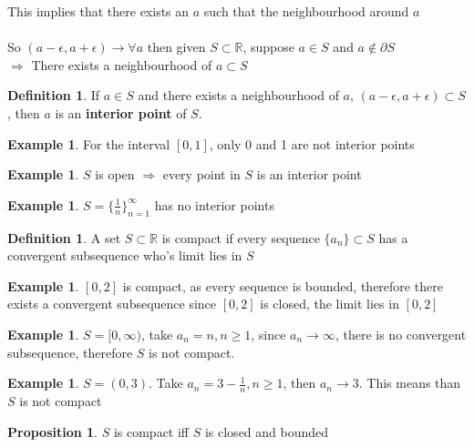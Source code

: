 \documentclass[12pt]{article}
\theoremstyle{plain}
\theoremstyle{definition}
\newtheorem{definition}[theorem]{Definition}
\newtheorem{example}[theorem]{Example}
\newtheorem{proposition}[theorem]{Proposition}
\begin{document}
This implies that there exists an $a$ such that the neighbourhood around $a$
\\
	 \\
	 So $(a-\epsilon, a+\epsilon) \to \forall a$ then given $S \subset \mathbb{R}$, suppose $a \in S$ and $a \not\in \partial S$\\
	  $\Longrightarrow$ There exists a neighbourhood of $a \subset S$

\begin{definition}
	If $a \in S$ and there exists a neighbourhood of $a$, $(a-\epsilon, a+\epsilon) \subset S$, then $a$ is an \textbf{interior point} of $S$.
\end{definition}

\begin{example}
	For the interval $[0,1]$, only 0 and 1 are not interior points
\end{example}

\begin{example}
	$S$ is open $\Longrightarrow$ every point in $S$ is an interior point
\end{example}

\begin{example}
	$S = \{ \frac{1}{n} \}^\infty_{n=1}$ has no interior points
\end{example}

\begin{definition}
	A set $S \subset \mathbb{R}$ is compact if every sequence $\{ a_n \} \subset S $ has a convergent subsequence who's limit lies in $S$
\end{definition}

\begin{example}
	$[0,2]$ is compact, as every sequence is bounded, therefore there exists a convergent subsequence since $[0,2]$ is closed, the limit lies in $[0,2]$
\end{example}

\begin{example}
	$S=[0,\infty)$, take $a_n = n, n\geq 1$, since $a_n \to \infty$, there is no convergent subsequence, therefore $S$ is not compact.
\end{example}

\begin{example}
	$S=(0,3)$. Take $a_n = 3 - \frac{1}{n}, n\geq 1$, then $a_n \to 3$. This means than $S$ is not compact
\end{example}

\begin{proposition}
	$S$ is compact iff $S$ is closed and bounded
\end{proposition}
\end{document}
